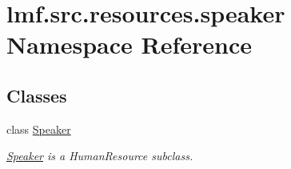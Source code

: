 \hypertarget{namespacelmf_1_1src_1_1resources_1_1speaker}{\section{lmf.\+src.\+resources.\+speaker Namespace Reference}
\label{namespacelmf_1_1src_1_1resources_1_1speaker}
}
\subsection*{Classes}
\begin{DoxyCompactItemize}
\item 
class \hyperlink{classlmf_1_1src_1_1resources_1_1speaker_1_1_speaker}{Speaker}
\begin{DoxyCompactList}\small\item\em \hyperlink{classlmf_1_1src_1_1resources_1_1speaker_1_1_speaker}{Speaker} is a Human\+Resource subclass. \end{DoxyCompactList}\end{DoxyCompactItemize}
